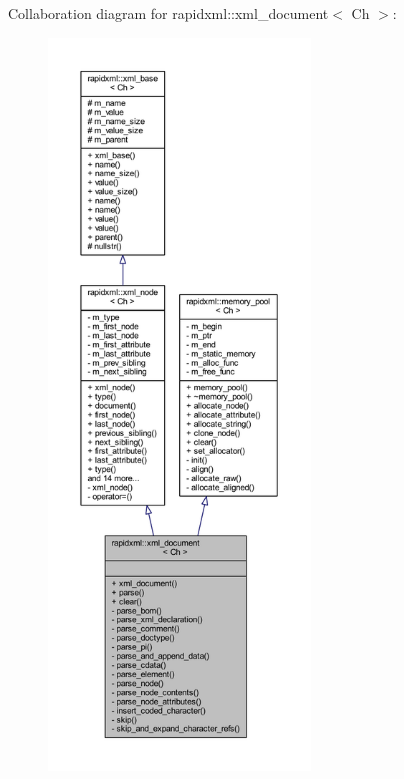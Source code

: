 Collaboration diagram for rapidxml\+:\+:xml\+\_\+document$<$ Ch $>$\+:
\nopagebreak
\begin{figure}[H]
\begin{center}
\leavevmode
\includegraphics[height=550pt]{singletonrapidxml_1_1xml__document__coll__graph}
\end{center}
\end{figure}
